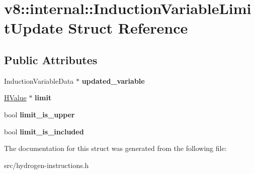 \hypertarget{structv8_1_1internal_1_1_induction_variable_limit_update}{}\section{v8\+:\+:internal\+:\+:Induction\+Variable\+Limit\+Update Struct Reference}
\label{structv8_1_1internal_1_1_induction_variable_limit_update}
\subsection*{Public Attributes}
\begin{DoxyCompactItemize}
\item 
\hypertarget{structv8_1_1internal_1_1_induction_variable_limit_update_a77d9df2762ac0a7cfcfcbe148ea6a728}{}Induction\+Variable\+Data $\ast$ {\bfseries updated\+\_\+variable}\label{structv8_1_1internal_1_1_induction_variable_limit_update_a77d9df2762ac0a7cfcfcbe148ea6a728}

\item 
\hypertarget{structv8_1_1internal_1_1_induction_variable_limit_update_a67d708058b301f494701016769ba62dc}{}\hyperlink{classv8_1_1internal_1_1_h_value}{H\+Value} $\ast$ {\bfseries limit}\label{structv8_1_1internal_1_1_induction_variable_limit_update_a67d708058b301f494701016769ba62dc}

\item 
\hypertarget{structv8_1_1internal_1_1_induction_variable_limit_update_a93a96c066ff77eddbfd6f126ad6a8af2}{}bool {\bfseries limit\+\_\+is\+\_\+upper}\label{structv8_1_1internal_1_1_induction_variable_limit_update_a93a96c066ff77eddbfd6f126ad6a8af2}

\item 
\hypertarget{structv8_1_1internal_1_1_induction_variable_limit_update_a682410f2aad1d431799560b8dafefc09}{}bool {\bfseries limit\+\_\+is\+\_\+included}\label{structv8_1_1internal_1_1_induction_variable_limit_update_a682410f2aad1d431799560b8dafefc09}

\end{DoxyCompactItemize}


The documentation for this struct was generated from the following file\+:\begin{DoxyCompactItemize}
\item 
src/hydrogen-\/instructions.\+h\end{DoxyCompactItemize}
